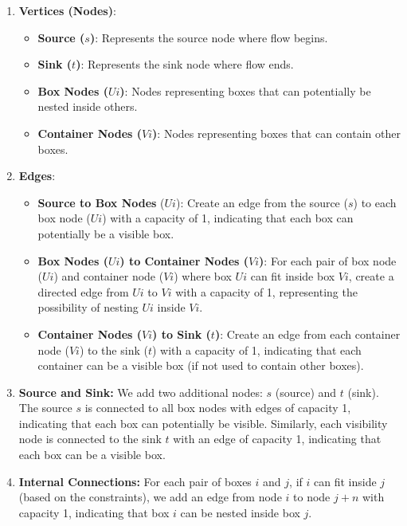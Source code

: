\documentclass{article}
\begin{document}
\begin{enumerate}
    \item \textbf{Vertices (Nodes)}:
    \begin{itemize}
        \item \textbf{Source ($s$)}: Represents the source node where flow begins.
        \item \textbf{Sink ($t$)}: Represents the sink node where flow ends.
        \item \textbf{Box Nodes ($Ui$)}: Nodes representing boxes that can potentially be nested inside others.
        \item \textbf{Container Nodes ($Vi$)}: Nodes representing boxes that can contain other boxes.
    \end{itemize}
    
    \item \textbf{Edges}:
    \begin{itemize}
        \item \textbf{Source to Box Nodes} ($Ui$): Create an edge from the source ($s$) to each box node ($Ui$) with a capacity of 1, indicating that each box can potentially be a visible box.
        \item \textbf{Box Nodes ($Ui$) to Container Nodes ($Vi$)}: For each pair of box node ($Ui$) and container node ($Vi$) where box $Ui$ can fit inside box $Vi$, create a directed edge from $Ui$ to $Vi$ with a capacity of 1, representing the possibility of nesting $Ui$ inside $Vi$.
        \item \textbf{Container Nodes ($Vi$) to Sink ($t$)}: Create an edge from each container node ($Vi$) to the sink ($t$) with a capacity of 1, indicating that each container can be a visible box (if not used to contain other boxes).
    \end{itemize}

  \item \textbf{Source and Sink:} We add two additional nodes: $s$ (source) and $t$ (sink). The source $s$ is connected to all box nodes with edges of capacity 1, indicating that each box can potentially be visible. Similarly, each visibility node is connected to the sink $t$ with an edge of capacity 1, indicating that each box can be a visible box.

  \item \textbf{Internal Connections:} For each pair of boxes $i$ and $j$, if $i$ can fit inside $j$ (based on the constraints), we add an edge from node $i$ to node $j+n$ with capacity 1, indicating that box $i$ can be nested inside box $j$.


\end{enumerate}
\end{document}
